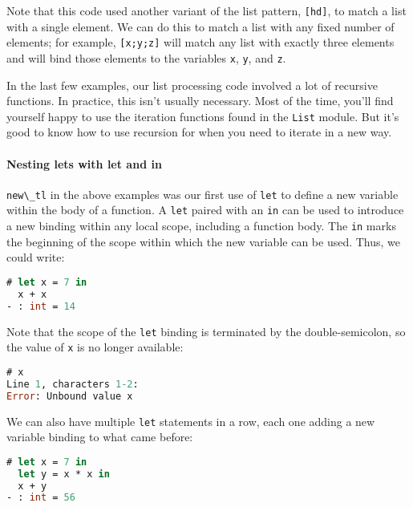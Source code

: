 Note that this code used another variant of the list pattern,
\passthrough{\lstinline![hd]!}, to match a list with a single element.
We can do this to match a list with any fixed number of elements; for
example, \passthrough{\lstinline![x;y;z]!} will match any list with
exactly three elements and will bind those elements to the variables
\passthrough{\lstinline!x!}, \passthrough{\lstinline!y!}, and
\passthrough{\lstinline!z!}.

In the last few examples, our list processing code involved a lot of
recursive functions. In practice, this isn't usually necessary. Most of
the time, you'll find yourself happy to use the iteration functions
found in the \passthrough{\lstinline!List!} module. But it's good to
know how to use recursion for when you need to iterate in a new way. ~

\hypertarget{nesting-lets-with-let-and-in}{%
\paragraph{Nesting lets with let and
in}\label{nesting-lets-with-let-and-in}}

\passthrough{\lstinline!new\_tl!} in the above examples was our first
use of \passthrough{\lstinline!let!} to define a new variable within the
body of a function. A \passthrough{\lstinline!let!} paired with an
\passthrough{\lstinline!in!} can be used to introduce a new binding
within any local scope, including a function body. The
\passthrough{\lstinline!in!} marks the beginning of the scope within
which the new variable can be used. Thus, we could write:

\begin{lstlisting}[language=Caml]
# let x = 7 in
  x + x
- : int = 14
\end{lstlisting}

Note that the scope of the \passthrough{\lstinline!let!} binding is
terminated by the double-semicolon, so the value of
\passthrough{\lstinline!x!} is no longer available:

\begin{lstlisting}[language=Caml]
# x
Line 1, characters 1-2:
Error: Unbound value x
\end{lstlisting}

We can also have multiple \passthrough{\lstinline!let!} statements in a
row, each one adding a new variable binding to what came before:

\begin{lstlisting}[language=Caml]
# let x = 7 in
  let y = x * x in
  x + y
- : int = 56
\end{lstlisting}


